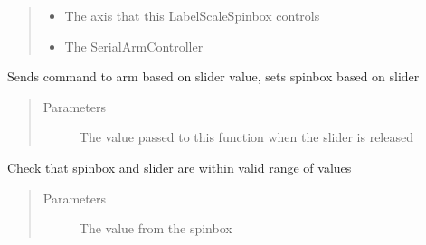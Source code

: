 \documentclass[letterpaper,10pt,english,openany,oneside]{sphinxmanual}
\begin{document}
\begin{fulllineitems}
\begin{fulllineitems}
\begin{quote}
\begin{description}
\begin{itemize}
\item {} 
 \textendash{} The axis that this LabelScaleSpinbox controls

\item {} 
 \textendash{} The SerialArmController

\end{itemize}

\end{description}\end{quote}

\end{fulllineitems}


\begin{fulllineitems}
\label{\detokenize{src/positionframe:PositionFrame.LabelScaleSpinbox.sliderUpdate}}
Sends command to arm based on slider value, sets spinbox based on slider
\begin{quote}\begin{description}
\item[{Parameters}] \leavevmode
{} \textendash{} The value passed to this function when the slider is released

\end{description}\end{quote}

\end{fulllineitems}


\begin{fulllineitems}
\label{\detokenize{src/positionframe:PositionFrame.LabelScaleSpinbox.validate_spinbox}}
Check that spinbox and slider are within valid range of values
\begin{quote}\begin{description}
\item[{Parameters}] \leavevmode
{} \textendash{} The value from the spinbox


\end{description}
\end{quote}
\end{fulllineitems}
\end{fulllineitems}
\end{document}
